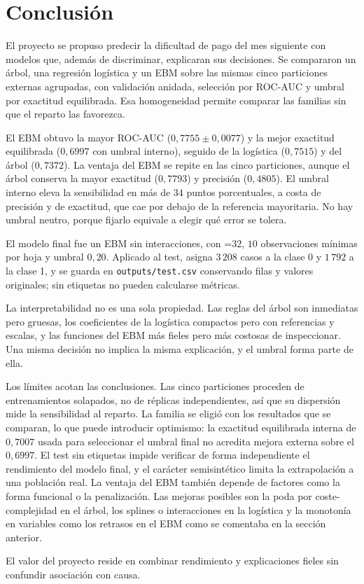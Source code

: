 \section{Conclusión}\label{sec:conclusion}

El proyecto se propuso predecir la dificultad de pago del mes siguiente con modelos que, además de discriminar, explicaran sus decisiones. Se compararon un árbol, una regresión logística y un EBM sobre las mismas cinco particiones externas agrupadas, con validación anidada, selección por ROC-AUC y umbral por exactitud equilibrada. Esa homogeneidad permite comparar las familias sin que el reparto las favorezca.

El EBM obtuvo la mayor ROC-AUC ($0{,}7755 \pm 0{,}0077$) y la mejor exactitud equilibrada ($0{,}6997$ con umbral interno), seguido de la logística ($0{,}7515$) y del árbol ($0{,}7372$). La ventaja del EBM se repite en las cinco particiones, aunque el árbol conserva la mayor exactitud ($0{,}7793$) y precisión ($0{,}4805$). El umbral interno eleva la sensibilidad en más de $34$ puntos porcentuales, a costa de precisión y de exactitud, que cae por debajo de la referencia mayoritaria. No hay umbral neutro, porque fijarlo equivale a elegir qué error se tolera.

El modelo final fue un EBM sin interacciones, con =32, $10$ observaciones mínimas por hoja y umbral $0{,}20$. Aplicado al test, asigna $3\,208$ casos a la clase 0 y $1\,792$ a la clase 1, y se guarda en \texttt{outputs/test.csv} conservando filas y valores originales; sin etiquetas no pueden calcularse métricas.

La interpretabilidad no es una sola propiedad. Las reglas del árbol son inmediatas pero gruesas, los coeficientes de la logística compactos pero con referencias y escalas, y las funciones del EBM más fieles pero más costosas de inspeccionar. Una misma decisión no implica la misma explicación, y el umbral forma parte de ella.

Los límites acotan las conclusiones. Las cinco particiones proceden de entrenamientos solapados, no de réplicas independientes, así que su dispersión mide la sensibilidad al reparto. La familia se eligió con los resultados que se comparan, lo que puede introducir optimismo: la exactitud equilibrada interna de $0{,}7007$ usada para seleccionar el umbral final no acredita mejora externa sobre el $0{,}6997$. El test sin etiquetas impide verificar de forma independiente el rendimiento del modelo final, y el carácter semisintético limita la extrapolación a una población real. La ventaja del EBM también depende de factores como la forma funcional o la penalización. Las mejoras posibles son la poda por coste-complejidad en el árbol, los splines o interacciones en la logística y la monotonía en variables como los retrasos en el EBM como se comentaba en la sección anterior.

El valor del proyecto reside en combinar rendimiento y explicaciones fieles sin confundir asociación con causa.

